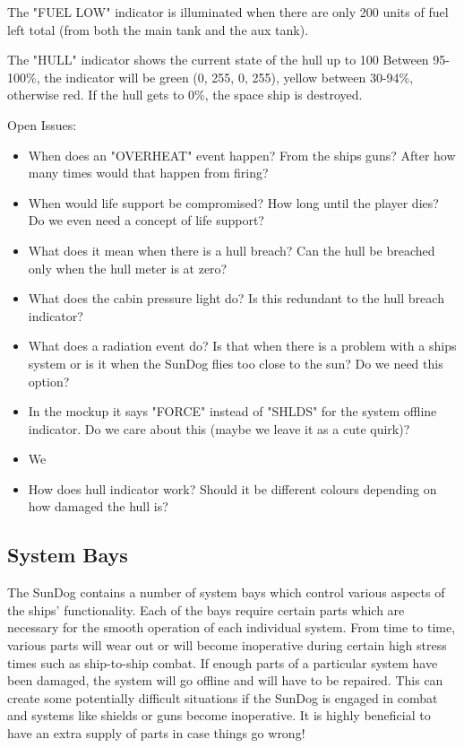 The "FUEL LOW" indicator is illuminated when there are only 200 units
of fuel left total (from both the main tank and the aux tank).

The "HULL" indicator shows the current state of the hull up to 100%
Between 95-100\%, the indicator will be green (0, 255, 0, 255),
yellow between 30-94\%, otherwise red.  If the hull gets to 0\%, the
space ship is destroyed. 


Open Issues:
\begin{itemize}
\item When does an "OVERHEAT" event happen?  From the ships guns?  After
how many times would that happen from firing?
\item When would life support be compromised?  How long until the player dies?
Do we even need a concept of life support?
\item What does it mean when there is a hull breach?  Can the hull be breached
only when the hull meter is at zero?
\item What does the cabin pressure light do?  Is this redundant to 
the hull breach indicator?
\item What does a radiation event do?  Is that when there is a problem with
a ships system or is it when the SunDog flies too close to the sun?  Do
we need this option?
\item In the mockup it says "FORCE" instead of "SHLDS" for the system
offline indicator.  Do we care about this (maybe we leave it as a cute
quirk)?
\item We 
\item How does hull indicator work?  Should it be different colours depending
on how damaged the hull is?
\end{itemize}

\subsection{System Bays}
The SunDog contains a number of system bays which control various aspects of
the ships' functionality.  Each of the bays require certain parts which are
necessary for the smooth operation of each individual system.  From time to
time, various parts will wear out or will become inoperative during certain
high stress times such as ship-to-ship combat.  If enough parts of a particular
system have been damaged, the system will go offline and will have to be
repaired.  This can create some potentially difficult situations if the
SunDog is engaged in combat and systems like shields or guns become
inoperative.  It is highly beneficial to have an extra supply of parts in
case things go wrong!

